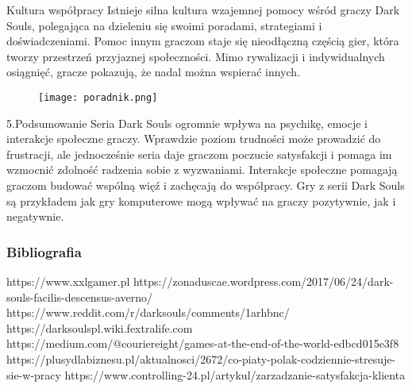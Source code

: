 \documentclass{beamer}
\begin{document}
\begin{frame}{Kultura współpracy}  %
\small Istnieje silna kultura wzajemnej pomocy wśród graczy Dark Souls, polegająca na dzieleniu się swoimi poradami, strategiami i doświadczeniami. Pomoc innym graczom staje się nieodłączną częścią gier, która tworzy przestrzeń przyjaznej społeczności. Mimo rywalizacji i  indywidualnych osiągnięć, gracze pokazują, że nadal można wspierać innych.

 \begin{figure}
    \centering
        \texttt{[image: poradnik.png]}
 
    \end{figure}
\end{frame}

\begin{frame}{5.Podsumowanie}  %
\small Seria Dark Souls ogromnie wpływa na psychikę, emocje i interakcje społeczne graczy. Wprawdzie poziom trudności może prowadzić do frustracji, ale jednocześnie seria daje graczom poczucie satysfakcji i pomaga im wzmocnić zdolność radzenia sobie z wyzwaniami. Interakcje społeczne pomagają graczom budować wspólną więź i zachęcają do współpracy.  Gry z serii Dark Souls są przykładem jak gry komputerowe mogą wpływać na graczy pozytywnie, jak i negatywnie.
\end{frame}

\begin{frame}
		\frametitle{Bibliografia}
			\begin{thebibliography}{99}
			https://www.xxlgamer.pl 
			https://zonaduscae.wordpress.com/2017/06/24/dark-souls-facilis-descensus-averno/
			https://www.reddit.com/r/darksouls/comments/1arhbnc/
			https://darksoulspl.wiki.fextralife.com 
			https://medium.com/@couriereight/games-at-the-end-of-the-world-edbcd015e3f8 
			https://plusydlabiznesu.pl/aktualnosci/2672/co-piaty-polak-codziennie-stresuje-sie-w-pracy 
			https://www.controlling-24.pl/artykul/zarzadzanie-satysfakcja-klienta
		\end{thebibliography}
	\end{frame}
\end{document}
